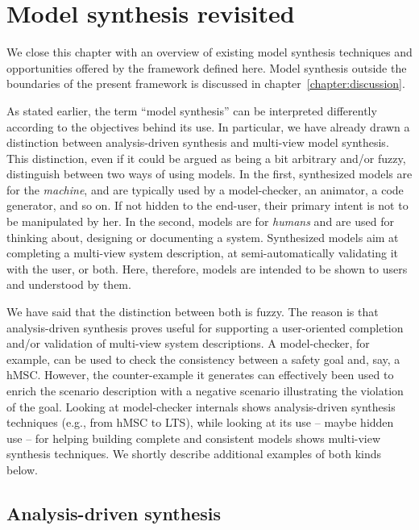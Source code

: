 \section{Model synthesis revisited\label{section:background-discussion}}

We close this chapter with an overview of existing model synthesis techniques and opportunities offered by the framework defined here. Model synthesis outside the boundaries of the present framework is discussed in chapter~\ref{chapter:discussion}.

As stated earlier, the term ``model synthesis'' can be interpreted differently according to the objectives behind its use. In particular, we have already drawn a distinction between analysis-driven synthesis and multi-view model synthesis. This distinction, even if it could be argued as being a bit arbitrary and/or fuzzy, distinguish between two ways of using models. In the first, synthesized models are for the \emph{machine}, and are typically used by a model-checker, an animator, a code generator, and so on. If not hidden to the end-user, their primary intent is not to be manipulated by her. In the second, models are for \emph{humans} and are used for thinking about, designing or documenting a system. Synthesized models aim at completing a multi-view system description, at semi-automatically validating it with the user, or both. Here, therefore, models are intended to be shown to users and understood by them.

We have said that the distinction between both is fuzzy. The reason is that analysis-driven synthesis proves useful for supporting a user-oriented completion and/or validation of multi-view system descriptions. A model-checker, for example, can be used to check the consistency between a safety goal and, say, a hMSC. However, the counter-example it generates can effectively been used to enrich the scenario description with a negative scenario illustrating the violation of the goal. Looking at model-checker internals shows analysis-driven synthesis techniques (e.g., from hMSC to LTS), while looking at its use -- maybe hidden use -- for helping building complete and consistent models shows multi-view synthesis techniques. We shortly describe additional examples of both kinds below.

\subsection*{Analysis-driven synthesis}

